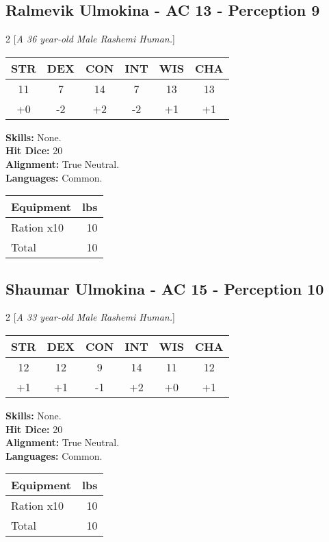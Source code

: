 \subsection*{Ralmevik Ulmokina - AC 13 - Perception 9}
\begin{multicols}{2}
[\textit{A 36 year-old Male Rashemi Human.}]
\begin{tabular}{cccccc}
 {STR}&
 {DEX}&
 {CON}&
 {INT}&
 {WIS}&
 {CHA}\\
\hline
11 & 7 & 14 & 7 & 13 & 13\\
+0 & -2 & +2 & -2 & +1 & +1
\end{tabular}
\textbf{Skills:} 
None.\\
\textbf{Hit Dice:} 20\\
\textbf{Alignment:} True Neutral.\\
\textbf{Languages:} 
Common.\\

\begin{tabular}{p{} r}
\textbf{Equipment} & lbs\\
\hline

Ration x10 & 10\\

\hline
Total & 10
\end{tabular}


\end{multicols}


\subsection*{Shaumar Ulmokina - AC 15 - Perception 10}
\begin{multicols}{2}
[\textit{A 33 year-old Male Rashemi Human.}]
\begin{tabular}{cccccc}
 {STR}&
 {DEX}&
 {CON}&
 {INT}&
 {WIS}&
 {CHA}\\
\hline
12 & 12 & 9 & 14 & 11 & 12\\
+1 & +1 & -1 & +2 & +0 & +1
\end{tabular}
\textbf{Skills:} 
None.\\
\textbf{Hit Dice:} 20\\
\textbf{Alignment:} True Neutral.\\
\textbf{Languages:} 
Common.\\

\begin{tabular}{p{} r}
\textbf{Equipment} & lbs\\
\hline

Ration x10 & 10\\

\hline
Total & 10
\end{tabular}


\end{multicols}


